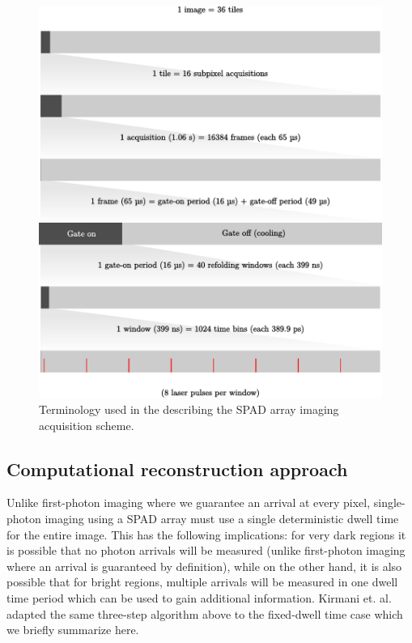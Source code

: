 \begin{figure}[h!]
\centerline{\includegraphics[width=15cm]{figure-first-spad-terms.pdf}}
\caption{Terminology used in the describing the SPAD array imaging acquisition scheme.}
\label{figure:first-spad-terms}
\end{figure}

\subsection{Computational reconstruction approach}

Unlike first-photon imaging where we guarantee an arrival at every pixel, single-photon imaging using a SPAD array must use a single deterministic dwell time for the entire image. This has the following implications: for very dark regions it is possible that no photon arrivals will be measured (unlike first-photon imaging where an arrival is guaranteed by definition), while on the other hand, it is also possible that for bright regions, multiple arrivals will be measured in one dwell time period which can be used to gain additional information. Kirmani et. al. \cite{kirmani-photon} adapted the same three-step algorithm above to the fixed-dwell time case which we briefly summarize here.


